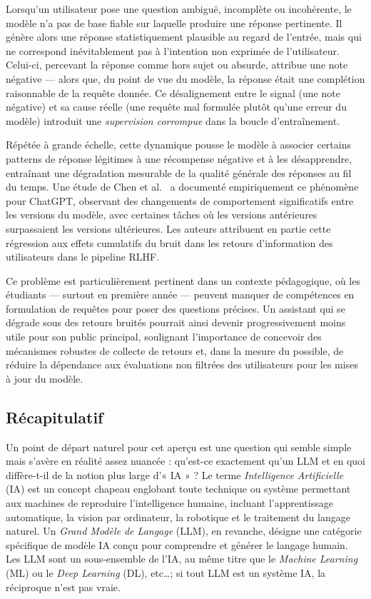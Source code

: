 \documentclass[a4paper,11pt]{article}
\begin{document}
Lorsqu'un utilisateur pose une question ambiguë, incomplète ou incohérente,
le modèle n'a pas de base fiable sur laquelle produire une réponse pertinente.
Il génère alors une réponse statistiquement plausible au regard de l'entrée,
mais qui ne correspond inévitablement pas à l'intention non exprimée de
l'utilisateur. Celui-ci, percevant la réponse comme hors sujet ou absurde,
attribue une note négative --- alors que, du point de vue du modèle, la
réponse était une complétion raisonnable de la requête donnée. Ce désalignement
entre le signal (une note négative) et sa cause réelle (une requête mal
formulée plutôt qu'une erreur du modèle) introduit une \emph{supervision
corrompue} dans la boucle d'entraînement.

Répétée à grande échelle, cette dynamique pousse le modèle à associer certains
patterns de réponse légitimes à une récompense négative et à les désapprendre,
entraînant une dégradation mesurable de la qualité générale des réponses au
fil du temps. Une étude de Chen et al.\ \cite{chen2023chatgpt} a documenté
empiriquement ce phénomène pour ChatGPT, observant des changements de
comportement significatifs entre les versions du modèle, avec certaines tâches
où les versions antérieures surpassaient les versions ultérieures. Les auteurs
attribuent en partie cette régression aux effets cumulatifs du bruit dans les
retours d'information des utilisateurs dans le pipeline RLHF.

Ce problème est particulièrement pertinent dans un contexte pédagogique, où
les étudiants --- surtout en première année --- peuvent manquer de compétences
en formulation de requêtes pour poser des questions précises. Un assistant qui
se dégrade sous des retours bruités pourrait ainsi devenir progressivement
moins utile pour son public principal, soulignant l'importance de concevoir
des mécanismes robustes de collecte de retours et, dans la mesure du possible,
de réduire la dépendance aux évaluations non filtrées des utilisateurs pour
les mises à jour du modèle.

\newpage
\subsection{Récapitulatif}
Un point de départ naturel pour cet aperçu est une question qui semble simple
mais s'avère en réalité assez nuancée : qu'est-ce exactement qu'un LLM et en
quoi diffère-t-il de la notion plus large d'« IA » ? Le terme \emph{Intelligence
Artificielle} (IA) est un concept chapeau englobant toute technique ou système
permettant aux machines de reproduire l'intelligence humaine, incluant
l'apprentissage automatique, la vision par ordinateur, la robotique et le
traitement du langage naturel. Un \emph{Grand Modèle de Langage} (LLM), en
revanche, désigne une catégorie spécifique de modèle IA conçu pour comprendre
et générer le langage humain. Les LLM sont un sous-ensemble de l'IA, au même
titre que le \emph{Machine Learning} (ML) ou le \emph{Deep Learning} (DL),
etc\dots ; si tout LLM est un système IA, la réciproque n'est pas vraie.
\end{document}
